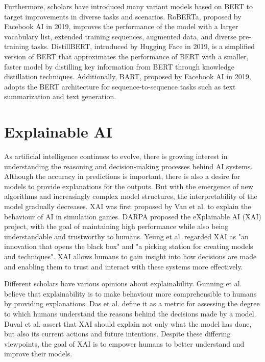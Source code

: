 \documentclass[ %
                    author={Bocheng Wang},
                supervisor={Dr. Qiang Liu},
                    degree={MSc},
                     title={A Research on Identification of Suicide Ideation in Texts with Multiple Models},
                      type={},
                      year={2024}]{dissertation}
\begin{document}
Furthermore, scholars have introduced many variant models based on BERT to target improvements in diverse tasks and scenarios. RoBERTa, proposed by Facebook AI in 2019\cite{liu2019roberta}, improves the performance of the model with a larger vocabulary list, extended training sequences, augmented data, and diverse pre-training tasks. DistillBERT, introduced by Hugging Face in 2019\cite{sanh2020distilbert}, is a simplified version of BERT that approximates the performance of BERT with a smaller, faster model by distilling key information from BERT through knowledge distillation techniques. Additionally, BART, proposed by Facebook AI in 2019\cite{lewis2019bart}, adopts the BERT architecture for sequence-to-sequence tasks such as text summarization and text generation.

\section{Explainable AI}
\noindent
As artificial intelligence continues to evolve, there is growing interest in understanding the reasoning and decision-making processes behind AI systems. Although the accuracy in predictions is important, there is also a desire for models to provide explanations for the outputs.\cite{doshi2017towards} But with the emergence of new algorithms and increasingly complex model structures, the interpretability of the model gradually decreases. XAI was first proposed by Van et al.\cite{van2004explainable} to explain the behaviour of AI in simulation games. DARPA proposed the eXplainable AI (XAI) project\cite{gunning2019darpa}, with the goal of maintaining high performance while also being understandable and trustworthy to humans. Yeung et al.\cite{2021Enhancing} regarded XAI as "an innovation that opens the black box" and "a picking station for creating models and techniques". XAI allows humans to gain insight into how decisions are made and enabling them to trust and interact with these systems more effectively.

Different scholars have various opinions about explainability. Gunning et al.\cite{gunning2019xai} believe that explainability is to make behaviour more comprehensible to humans by providing explanations. Das et al.\cite{das2020taxonomy} define it as a metric for assessing the degree to which humans understand the reasons behind the decisions made by a model. Duval et al.\cite{duval2019explainable} assert that XAI should explain not only what the model has done, but also its current actions and future intentions. Despite these differing viewpoints, the goal of XAI is to empower humans to better understand and improve their models.
\end{document}

